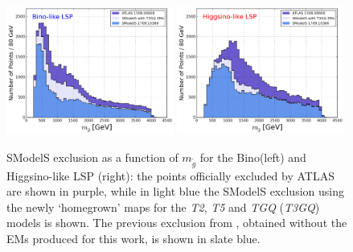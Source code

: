 \documentclass[a4paper,11pt]{article}
\newcommand{\MGLU}{$ m _{ \tilde g } $\xspace}
\begin{document}
\begin{figure}[!]
\begin{center}
\includegraphics[width=0.49\textwidth]{PLOTS/BINO_Comparison_Gluino.png}
\includegraphics[width=0.49\textwidth]{PLOTS/HIGGSINO_Comparison_Gluino.png}
\end{center}
\caption{SModelS exclusion as a function of \MGLU for the Bino(left) and Higgsino-like LSP (right): the points officially excluded by ATLAS are shown in purple, while in light blue the SModelS exclusion using the newly `homegrown' maps for the \textit{T2}, \textit{T5} and \textit{TGQ} (\textit{T3GQ}) models is shown. The previous exclusion from \cite{Ambrogi:2017lov}, obtained without the EMs produced for this work, is shown in slate blue.} 
\label{pmssm_new_exclusion_gluino}
\end{figure}
%
\end{document}
